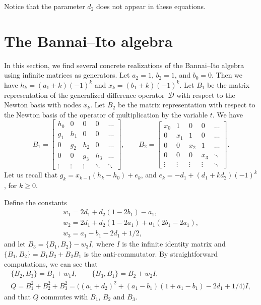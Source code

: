 \documentclass[10pt,a4paper]{amsart}
\numberwithin{equation}{section}
\begin{document}
Notice that the parameter $d_2$ does not appear in these equations.

\section{The Bannai--Ito algebra}\label{section7}
In this section, we find several concrete realizations of the Bannai--Ito algebra using infinite matrices as generators.
Let $a_2=1$, $b_2=1$, and $b_0=0$. Then we have $h_k=(a_1 +k) (-1)^k $ and ${x_k=(b_1+k) (-1)^k}$.
Let $B_1$ be the matrix representation of the generalized difference operator~$\mathcal D$ with respect to the Newton basis with nodes $x_k$. Let $B_2$ be the matrix representation with respect to the Newton basis of the operator of multiplication by the variable $t$. We have{\samepage
\begin{equation*}%
 B_1= \begin{bmatrix} h_0 & 0 & 0 & 0 & \dots \\
   g_1 & h_1 & 0 & 0 & \dots \\
     0 & g_2  & h_2  & 0 & \dots \\
       0 & 0 & g_3  & h_3 & \dots \\
   \vdots  & \vdots  & \vdots  & \ddots  &  \ddots  \end{bmatrix}, \qquad
 B_2 = \begin{bmatrix} x_0 & 1 & 0 & 0 & \dots \\
       0 & x_1 & 1 & 0 & \dots \\
      0 & 0 & x_2  & 1 & \dots \\
      0 & 0 & 0 & x_3 & \ddots \\
 \vdots  & \vdots  & \vdots  & \vdots  &  \ddots  \end{bmatrix}.
\end{equation*}
	Let us recall that $g_k=x_{k-1}(h_k-h_0) + e_k$, and
	$e_k=-d_1 + (d_1+ k d_2) (-1)^k$, for $k\ge 0$.}

Define the constants
\begin{gather}
	w_1=2 d_1 +d_2 (1-2 b_1)-a_1, \nonumber\\
	 w_2=2 d_1 + d_2 (1- 2 a_1)+ a_1 ( 2 b_1 - 2 a_1), \nonumber\\
	 w_3= a_1 -b_1 - 2 d_1 +1/2,\label{eq:defwj}
\end{gather}
and let $B_3=\{B_1, B_2\} - w_3 I$, where $I$ is the infinite identity matrix and
$\{B_1,B_2\}=B_1 B_2 + B_2 B_1$ is the anti-commutator.
By straightforward computations, we can see that
\begin{gather*}
 \{B_2, B_3\}=B_1 + w_1 I, \qquad  \{B_3,B_1\}= B_2 + w_2 I, \\
 Q=B_1^2+ B_2^2+B_3^2= \bigl((a_1+d_2)^2+(a_1-b_1)(1+ a_1 - b_1) - 2 d_1 +1/4\bigr) I,
 \end{gather*}
and that $Q$ commutes with $B_1$, $B_2$ and $B_3$.
\end{document}
